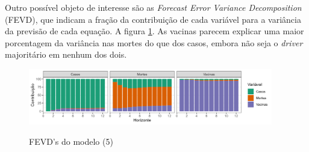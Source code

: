 \documentclass[
    article,
	12pt,				%
	oneside,			%
	a4paper,			%
	english,			%
	brazil,				%
	hyperref = {colorlinks, citecolor=c1d, linkcolor=c2d, urlcolor=c3d, colorlinks}
	]{abntex2}
\newcounter{j}
\begin{document}
\begin{apendicesenv}
Outro possível objeto de interesse são as \textit{Forecast Error Variance Decomposition} (FEVD), que indicam a fração da contribuição de cada variável para a variância da previsão de cada equação. A figura \ref{fig:apfevd}. As vacinas parecem explicar uma maior porcentagem da variância nas mortes do que dos casos, embora não seja o \textit{driver} majoritário em nenhum dos dois.

\begin{figure}[H]
    \centering
    \caption{FEVD's do modelo (5)}
    \includegraphics[width = 0.95\textwidth]{Figuras/ap_fevd.png}
    \label{fig:apfevd}
\end{figure}

\newpage %


\end{apendicesenv}
\end{document}

